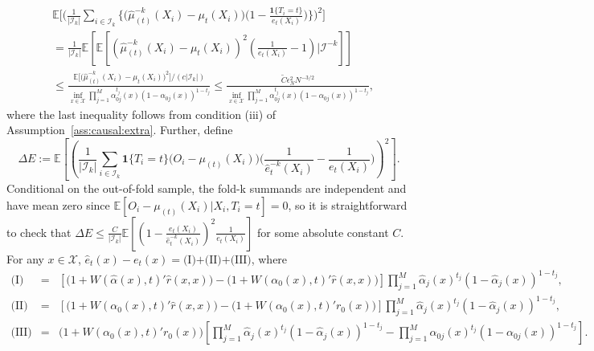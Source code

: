 \documentclass[11pt]{article}
\begin{document}
$$\begin{array}{rl}
&\displaystyle\mathbb{E}\bigg[\bigg(\frac{1}{|\mathcal{I}_k|}\sum_{i\in\mathcal{I}_k}\bigg\{\bigg(\hat{\mu}_{(t)}^{-k}(X_i)-\mu_t(X_i)\bigg)\bigg(1-\frac{\mathbf{1}\{T_i=t\}}{e_t(X_i)}\bigg)\bigg\}\bigg)^2\bigg]\\
&\displaystyle=\frac{1}{|\mathcal{I}_k|}\mathbb{E}\left[\mathbb{E}\left[\left(\hat{\mu}_{(t)}^{-k}(X_i)-\mu_t(X_i)\right)^2\left(\frac{1}{e_t(X_i)}-1\right)\big|\mathcal{I}^{-k}\right]\right]\\
&\displaystyle\leq\frac{\mathbb{E}\big[\big(\hat{\mu}_{(t)}^{-k}(X_i)-\mu_t(X_i)\big)^2\big]/(c|\mathcal{I}_k|)}{\inf_{x\in\mathcal{X}}\prod_{j=1}^M \alpha_{0j}^{t_j}(x)(1-\alpha_{0j}(x))^{1-t_j}}\leq\frac{\tilde{C}\epsilon_N^2N^{-3/2}}{\inf_{x\in\mathcal{X}}\prod_{j=1}^M \alpha_{0j}^{t_j}(x)(1-\alpha_{0j}(x))^{1-t_j}},
\end{array}$$
where the last inequality follows from condition (iii) of Assumption~\ref{ass:causal:extra}. Further, define 
$$\Delta E:=\mathbb{E}\left[\left(\frac{1}{|\mathcal{I}_k|}\sum_{i\in\mathcal{I}_k}\mathbf{1}\{T_i=t\}\bigg(O_i-\mu_{(t)}(X_i)\bigg)\bigg(\frac{1}{\hat{e}_t^{-k}(X_i)}-\frac{1}{e_t(X_i)}\bigg)\right)^2\right].$$ Conditional on the out-of-fold sample, the fold-k summands are independent and have mean zero since $\mathbb{E}[O_i-\mu_{(t)}(X_i)|X_i,T_i=t]=0$, so
it is straightforward to check that $\Delta E\leq\frac{C}{|\mathcal{I}_k|}\mathbb{E}\left[\left(1-\frac{e_t(X_i)}{\hat{e}_t^{-k}(X_i)}\right)^2\frac{1}{e_t(X_i)}\right]$ for some absolute constant $C$. For any $x\in\mathcal{X}$, $\hat{e}_t(x)-e_t(x)=\textrm{(I)+(II)+(III)}$, where 
$$\begin{array}{rcl}
\textrm{(I)}&=&\displaystyle\left[\Big(1+W(\hat\alpha(x),t)'\hat r(x,x)\Big)-\Big(1+W(\alpha_0(x),t)'\hat r(x,x)\Big)\right]\prod_{j=1}^M\hat\alpha_j(x)^{t_j}(1-\hat\alpha_j(x))^{1-t_j},\\
\textrm{(II)}&=&\displaystyle\left[\Big(1+W(\alpha_0(x),t)'\hat r(x,x)\Big)-\Big(1+W(\alpha_0(x),t)'r_0(x)\Big)\right]\prod_{j=1}^M\hat\alpha_j(x)^{t_j}(1-\hat\alpha_j(x))^{1-t_j},\\
\textrm{(III)}&=&\displaystyle\Big(1+W(\alpha_0(x),t)'r_0(x)\Big)\left[\prod_{j=1}^M\hat\alpha_j(x)^{t_j}(1-\hat\alpha_j(x))^{1-t_j}-\prod_{j=1}^M\alpha_{0j}(x)^{t_j}(1-\alpha_{0j}(x))^{1-t_j}\right].
\end{array}$$
\end{document}
